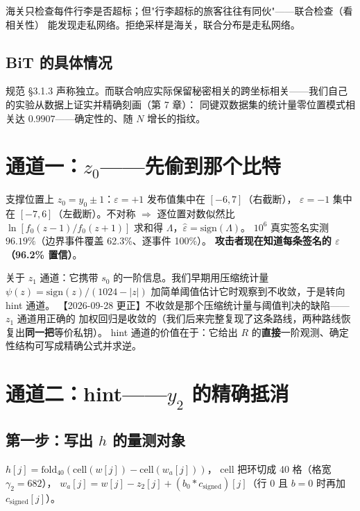 \documentclass[11pt,a4paper]{ctexart}
\begin{document}
\begin{intuition}
海关只检查每件行李是否超标；但"行李超标的旅客往往有同伙"——联合检查（看相关性）
能发现走私网络。拒绝采样是海关，联合分布是走私网络。
\end{intuition}

\subsection{BiT 的具体情况}

规范 §3.1.3 声称独立。而联合响应实际保留秘密相关的跨坐标相关——我们自己的实验从数据上证实并精确刻画（第 7 章）：
同键双数据集的统计量零位置模式相关达 $0.9907$——确定性的、随 $N$ 增长的指纹。

\section{通道一：$z_0$——先偷到那个比特}

支撑位置上 $z_0 = y_0 \pm 1$：$\varepsilon=+1$ 发布值集中在 $[-6,7]$（右截断），
$\varepsilon=-1$ 集中在 $[-7,6]$（左截断）。不对称 $\Rightarrow$ 逐位置对数似然比
$\ln[f_0(z-1)/f_0(z+1)]$ 求和得 $\Lambda$，$\hat\varepsilon=\mathrm{sign}(\Lambda)$。
$10^6$ 真实签名实测 $96.19\%$（边界事件覆盖 62.3\%、逐事件 100\%）。
\textbf{攻击者现在知道每条签名的 $\varepsilon$（96.2\% 置信）}。

关于 $z_1$ 通道：它携带 $s_0$ 的一阶信息。我们早期用压缩统计量
$\psi(z)=\mathrm{sign}(z)/(1024-|z|)$ 加简单阈值估计它时观察到不收敛，于是转向 hint 通道。
【2026-09-28 更正】不收敛是那个压缩统计量与阈值判决的缺陷——$z_1$ 通道用正确的
加权回归是收敛的（我们后来完整复现了这条路线，两种路线恢复出\textbf{同一把}等价私钥）。
hint 通道的价值在于：它给出 $R$ 的\textbf{直接}一阶观测、确定性结构可写成精确公式并求逆。

\section{通道二：hint——$y_2$ 的精确抵消}

\subsection{第一步：写出 $h$ 的量测对象}

$h[j] = \mathrm{fold}_{40}(\mathrm{cell}(w[j]) - \mathrm{cell}(w_a[j]))$，
$\mathrm{cell}$ 把环切成 40 格（格宽 $\gamma_2=682$），
$w_a[j] = w[j] - z_2[j] + (b_0*c_{\mathrm{signed}})[j]$（行 0 且 $b=0$ 时再加
$c_{\mathrm{signed}}[j]$）。
\end{document}
